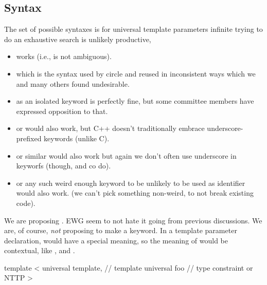\documentclass{wg21}
\begin{document}
\subsection{Syntax}

The set of possible syntaxes is for universal template parameters infinite trying to do an exhaustive search is unlikely productive,

\begin{itemize}

\item {} works (i.e., is not ambiguous).

\item {} which is the syntax used by circle and  reused  in inconsistent ways
which we and many others found undesirable.

\item {} as an isolated keyword is perfectly fine, but some committee members have expressed opposition to that.

\item {} or  would also work, but C++ doesn't traditionally embrace underscore-prefixed keywords (unlike C).

\item {} or similar would also work but again we don't often use underscore in keyworfs (though,  and co do).

\item {} or any such weird enough keyword to be unlikely to be used as identifier would also work. (we can't pick something non-weird, to not break existing code).

\end{itemize}

We are proposing . EWG seem to not hate it going from previous discussions.
We are, of course, \emph{not} proposing to make  a keyword.
In a template parameter declaration,  would have a special meaning, so the meaning of  would be
contextual, like ,  and .


\begin{colorblock}
template <
        universal template, // template
        universal foo       // type constraint or NTTP
>
\end{colorblock}
\end{document}
